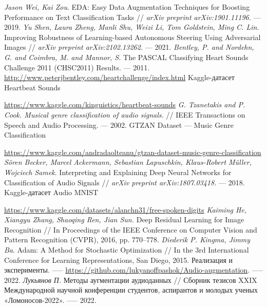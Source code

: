 \documentclass[12pt, fleqn]{article}
\begin{document}
\begin{thebibliography}{3}
	\textit{Jason Wei, Kai Zou}. EDA: Easy Data Augmentation Techniques for Boosting Performance on Text Classification Tasks // \textit{arXiv preprint arXiv:1901.11196.} --- 2019.
	\textit{Yu Shen, Laura Zheng, Manli Shu, Weizi Li, Tom Goldstein, Ming C. Lin}. Improving Robustness of Learning-based Autonomous Steering Using Adversarial Images // \textit{arXiv preprint arXiv:2102.13262.} --- 2021.
	\textit{Bentley, P. and Nordehn, G. and Coimbra, M. and Mannor, S.} The {PASCAL} {C}lassifying {H}eart {S}ounds {C}hallenge 2011 {(CHSC2011)} {R}esults. --- 2011.
	\url{http://www.peterjbentley.com/heartchallenge/index.html}
	Kaggle-датасет Heartbeat Sounds
	
	\url{https://www.kaggle.com/kinguistics/heartbeat-sounds}
    \textit{G. Tzanetakis and P. Cook. Musical genre classification of audio signals.}    // IEEE Transactions on Speech and Audio Processing. --- 2002.
    GTZAN Dataset --- Music Genre Classification
    
    \url{https://www.kaggle.com/andradaolteanu/gtzan-dataset-music-genre-classification}
    \textit{Sören Becker, Marcel Ackermann, Sebastian Lapuschkin, Klaus-Robert Müller, Wojciech Samek}. Interpreting and Explaining Deep Neural Networks for Classification of Audio Signals // \textit{arXiv preprint arXiv:1807.03418.} --- 2018.
    Kaggle-датасет Audio MNIST
    
    \url{https://www.kaggle.com/datasets/alanchn31/free-spoken-digits}
    \textit{Kaiming He, Xiangyu Zhang, Shaoqing Ren, Jian Sun.} Deep Residual Learning for Image Recognition // In Proceedings of the IEEE Conference on Computer Vision and Pattern Recognition (CVPR), 2016, pp. 770--778.
	\textit{Diederik P. Kingma, Jimmy Ba}. Adam: A Method for Stochastic Optimization // In the 3rd International Conference for Learning Representations, San Diego, 2015.
	Реализация и эксперименты. —-- \url{https://github.com/lukyanoffpashok/Audio-augmentation}. —-- 2022.
	\textit{Лукьянов П.} Методы аугментации аудиоданных // Сборник тезисов XXIX Международной научной
    конференции студентов, аспирантов и молодых ученых «Ломоносов-2022». —-- 2022.
	
\end{thebibliography}
\end{document}
